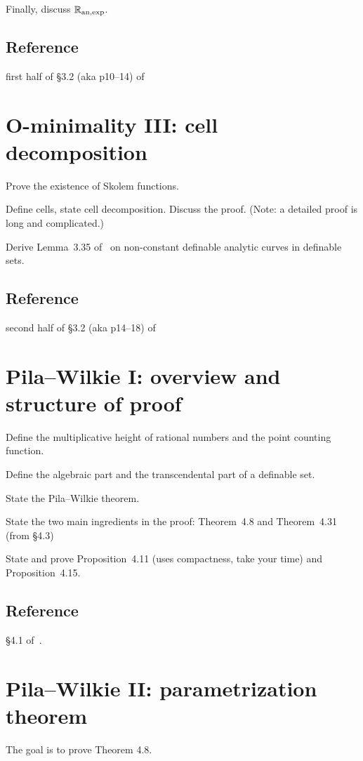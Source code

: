 \documentclass[10pt, a4paper]{amsart}
\begin{document}
Finally, discuss $\mathbb{R}_{\mathrm{an},\exp}$.

\subsection*{Reference} first half of \S3.2 (aka p10--14) of~\cite{scanlon}

\section{O-minimality III: cell decomposition}

Prove the existence of Skolem functions.

Define cells, state cell decomposition. Discuss the proof.
(Note: a detailed proof is long and complicated.)

Derive Lemma~3.35 of~\cite{scanlon} on non-constant definable analytic curves
in definable sets.

\subsection*{Reference} second half of \S3.2 (aka p14--18) of~\cite{scanlon}

\section{Pila--Wilkie I: overview and structure of proof}

Define the multiplicative height of rational numbers and the point counting function.

Define the algebraic part and the transcendental part of a definable set.

State the Pila--Wilkie theorem.

State the two main ingredients in the proof:
Theorem~4.8 and Theorem~4.31 (from \S4.3)

State and prove Proposition~4.11 (uses compactness, take your time) and Proposition~4.15.

\subsection*{Reference} \S4.1 of~\cite{scanlon}.

\section{Pila--Wilkie II: parametrization theorem}

The goal is to prove Theorem 4.8.
\end{document}
